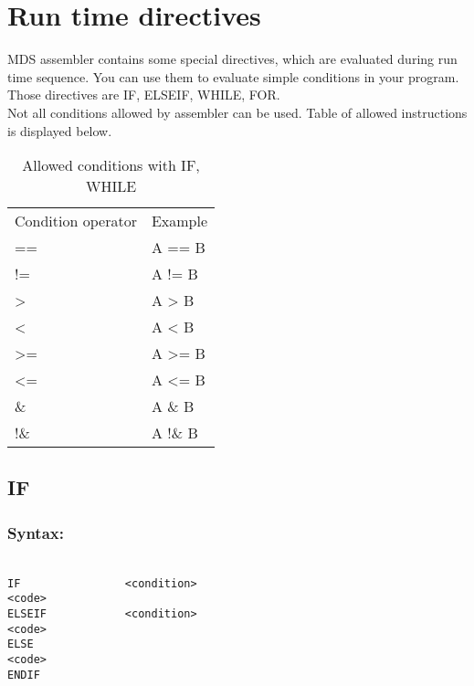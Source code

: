 {    \section{Run time directives}
    MDS assembler contains some special directives, which are evaluated during run time sequence. You can use them to evaluate simple conditions in your program.
    Those directives are IF, ELSEIF, WHILE, FOR.\\ Not all conditions allowed by assembler can be used.
    Table of allowed instructions is displayed below.
        \begin{table}[h!]
                \mysmallfont{}
                \centering{}
                \begin{tabular}{|l|l}
                \hline
                Condition operator       &          Example  \\
                ==                       &          A ==  B  \\
                !=                       &          A !=  B  \\
                >                        &          A >   B  \\
                <                        &          A <   B  \\
                >=                       &          A >=  B  \\
                <=                       &          A <=  B  \\
                \&                       &          A \&  B  \\
                !\&                      &          A !\& B
                \end{tabular}
                \caption{Allowed conditions with IF, WHILE}
        \end{table}

        \subsection{IF}
            \subsubsection{Syntax:}
            {
                ~\\
                \usecodefont
                \verb'IF                <condition>'\\
                \verb'<code>'\\
                \verb'ELSEIF            <condition>'\\
                \verb'<code>'\\
                \verb'ELSE'\\
                \verb'<code>'\\
                \verb'ENDIF'\\
            }

}
